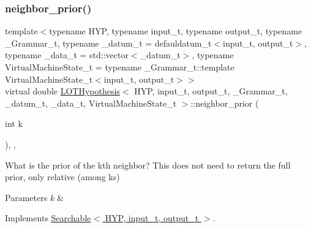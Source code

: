 \subsubsection{\texorpdfstring{neighbor\+\_\+prior()}{neighbor\_prior()}}
{\footnotesize\ttfamily template$<$typename H\+YP, typename input\+\_\+t, typename output\+\_\+t, typename \+\_\+\+Grammar\+\_\+t, typename \+\_\+datum\+\_\+t = defauldatum\+\_\+t$<$input\+\_\+t, output\+\_\+t$>$, typename \+\_\+data\+\_\+t = std\+::vector$<$\+\_\+datum\+\_\+t$>$, typename Virtual\+Machine\+State\+\_\+t = typename \+\_\+\+Grammar\+\_\+t\+::template Virtual\+Machine\+State\+\_\+t$<$input\+\_\+t, output\+\_\+t$>$$>$ \\
virtual double \hyperlink{class_l_o_t_hypothesis}{L\+O\+T\+Hypothesis}$<$ H\+YP, input\+\_\+t, output\+\_\+t, \+\_\+\+Grammar\+\_\+t, \+\_\+datum\+\_\+t, \+\_\+data\+\_\+t, Virtual\+Machine\+State\+\_\+t $>$\+::neighbor\+\_\+prior (\begin{DoxyParamCaption}\item[{int}]{k }\end{DoxyParamCaption})\hspace{0.3cm}{\ttfamily [inline]}, {\ttfamily [override]}, {\ttfamily [virtual]}}



What is the prior of the k\textquotesingle{}th neighbor? This does not need to return the full prior, only relative (among ks) 


\begin{DoxyParams}{Parameters}
{\em k} & \\
\hline
\end{DoxyParams}


Implements \hyperlink{class_searchable_abebbaaf94b0502a35d0ba686af73bd08}{Searchable$<$ H\+Y\+P, input\+\_\+t, output\+\_\+t $>$}.

\mbox{\label{class_l_o_t_hypothesis_a097cde606ec3f277fdeb92145599027f}} 
